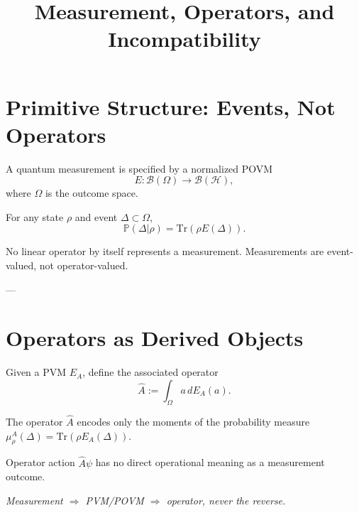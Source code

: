 \documentclass[11pt]{article}
\title{Measurement, Operators, and Incompatibility}
\begin{document}
\maketitle

\section{Primitive Structure: Events, Not Operators}

\begin{axiom}
A quantum measurement is specified by a normalized POVM
\[
E:\mathcal B(\Omega)\to\mathcal B(\mathcal H),
\]
where $\Omega$ is the outcome space.
\end{axiom}

\begin{axiom}
For any state $\rho$ and event $\Delta\subset\Omega$,
\[
\mathbb P(\Delta|\rho)=\mathrm{Tr}(\rho E(\Delta)).
\]
\end{axiom}

\begin{remark}
No linear operator by itself represents a measurement.
Measurements are event-valued, not operator-valued.
\end{remark}

---

\section{Operators as Derived Objects}

\begin{definition}
Given a PVM $E_A$, define the associated operator
\[
\hat A := \int_\Omega a\, dE_A(a).
\]
\end{definition}

\begin{proposition}
The operator $\hat A$ encodes only the moments of the probability measure
$\mu_\rho^A(\Delta)=\mathrm{Tr}(\rho E_A(\Delta))$.
\end{proposition}

\begin{corollary}
Operator action $\hat A\psi$ has no direct operational meaning as a
measurement outcome.
\end{corollary}

\begin{center}
\emph{Measurement $\Rightarrow$ PVM/POVM $\Rightarrow$ operator, never the reverse.}
\end{center}
\end{document}
